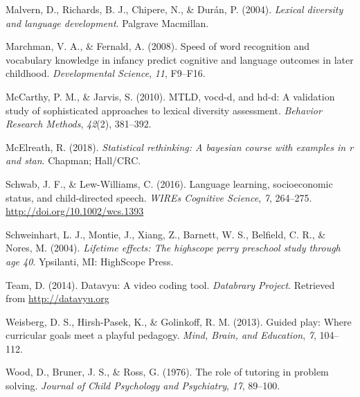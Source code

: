 \documentclass[man,floatsintext]{apa6}
\begin{document}
\leavevmode\hypertarget{ref-Malvern2004}{}%
Malvern, D., Richards, B. J., Chipere, N., \& Durán, P. (2004). \emph{Lexical diversity and language development}. Palgrave Macmillan.

\leavevmode\hypertarget{ref-Marchman2008}{}%
Marchman, V. A., \& Fernald, A. (2008). Speed of word recognition and vocabulary knowledge in infancy predict cognitive and language outcomes in later childhood. \emph{Developmental Science}, \emph{11}, F9--F16.

\leavevmode\hypertarget{ref-McCarthy2010}{}%
McCarthy, P. M., \& Jarvis, S. (2010). MTLD, vocd-d, and hd-d: A validation study of sophisticated approaches to lexical diversity assessment. \emph{Behavior Research Methods}, \emph{42}(2), 381--392.

\leavevmode\hypertarget{ref-McElreath2018}{}%
McElreath, R. (2018). \emph{Statistical rethinking: A bayesian course with examples in r and stan}. Chapman; Hall/CRC.

\leavevmode\hypertarget{ref-Schwab2016}{}%
Schwab, J. F., \& Lew-Williams, C. (2016). Language learning, socioeconomic status, and child-directed speech. \emph{WIREs Cognitive Science}, \emph{7}, 264--275. \url{http://doi.org/10.1002/wcs.1393}

\leavevmode\hypertarget{ref-PerryPreschool2004}{}%
Schweinhart, L. J., Montie, J., Xiang, Z., Barnett, W. S., Belfield, C. R., \& Nores, M. (2004). \emph{Lifetime effects: The highscope perry preschool study through age 40}. Ypsilanti, MI: HighScope Press.

\leavevmode\hypertarget{ref-datavyu}{}%
Team, D. (2014). Datavyu: A video coding tool. \emph{Databrary Project}. Retrieved from \url{http://datavyu.org}

\leavevmode\hypertarget{ref-Weisberg2013}{}%
Weisberg, D. S., Hirsh-Pasek, K., \& Golinkoff, R. M. (2013). Guided play: Where curricular goals meet a playful pedagogy. \emph{Mind, Brain, and Education}, \emph{7}, 104--112.

\leavevmode\hypertarget{ref-Wood1976}{}%
Wood, D., Bruner, J. S., \& Ross, G. (1976). The role of tutoring in problem solving. \emph{Journal of Child Psychology and Psychiatry}, \emph{17}, 89--100.

\endgroup
\end{document}
